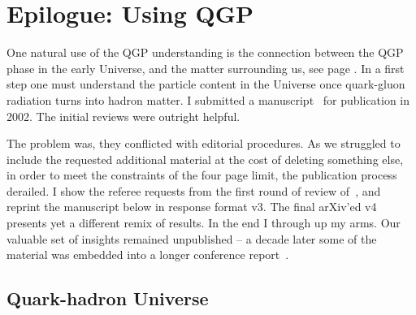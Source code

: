 \section{Epilogue: Using QGP}
One natural use of the QGP understanding is the connection between the QGP phase in the early Universe, and the matter surrounding us, see page \pageref{UniverseR1}. In a first step one must understand the particle content in the Universe once quark-gluon  radiation turns into hadron matter. I submitted a manuscript~\cite{Fromerth:2002wb} for publication in 2002. The initial reviews were  outright helpful. 

The problem  was, they conflicted with editorial procedures. As we struggled to include the requested additional material at the cost of deleting something else, in order to meet the constraints of the four page limit, the publication process  derailed. I show the referee requests from the first round of review of~\cite{Fromerth:2002wb}, and reprint the manuscript below in response format v3. The final arXiv\rq ed v4  presents yet  a different remix of results. In the end I through up my arms. Our valuable set of insights remained unpublished -- a decade later some of the material was embedded into a longer conference report~\cite{Fromerth:2012fe}. \\

\subsection{Quark-hadron Universe}
